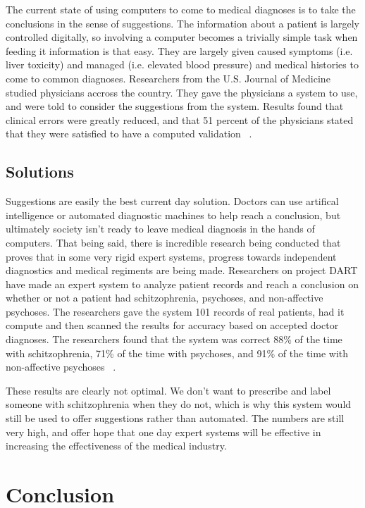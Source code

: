 \documentclass[11pt]{article}
\newcommand{\tab}{\hspace*{2em}}
\begin{document}
\begin{doublespace}
\tab The current state of using computers to come to medical diagnoses is to take the conclusions in the sense of suggestions. The information about a patient is largely controlled digitally, so involving a computer becomes a trivially simple task when feeding it information is that easy. They are largely given caused symptoms (i.e. liver toxicity) and managed (i.e. elevated blood pressure) and medical histories to come to common diagnoses. Researchers from the U.S. Journal of Medicine studied physicians accross the country. They gave the physicians a system to use, and were told to consider the suggestions from the system. Results found that clinical errors were greatly reduced, and that 51 percent of the physicians stated that they were satisfied to have a computed validation ~\cite{McDonald}.

\subsection{Solutions}

\tab Suggestions are easily the best current day solution. Doctors can use artifical intelligence or automated diagnostic machines to help reach a conclusion, but ultimately society isn't ready to leave medical diagnosis in the hands of computers. That being said, there is incredible research being conducted that proves that in some very rigid expert systems, progress towards independent diagnostics and medical regiments are being made. Researchers on project DART have made an expert system to analyze patient records and reach a conclusion on whether or not a patient had schitzophrenia, psychoses, and non-affective psychoses. The researchers gave the system 101 records of real patients, had it compute and then scanned the results for accuracy based on accepted doctor diagnoses. The researchers found that the system was correct 88\% of the time with schitzophrenia, 71\% of the time with psychoses, and 91\% of the time with non-affective psychoses ~\cite{Yarnall:1966:CAM:800256.810706}.

\tab These results are clearly not optimal. We don't want to prescribe and label someone with schitzophrenia when they do not, which is why this system would still be used to offer suggestions rather than automated. The numbers are still very high, and offer hope that one day expert systems will be effective in increasing the effectiveness of the medical industry.

\section{Conclusion}


\end{doublespace}
\end{document}
